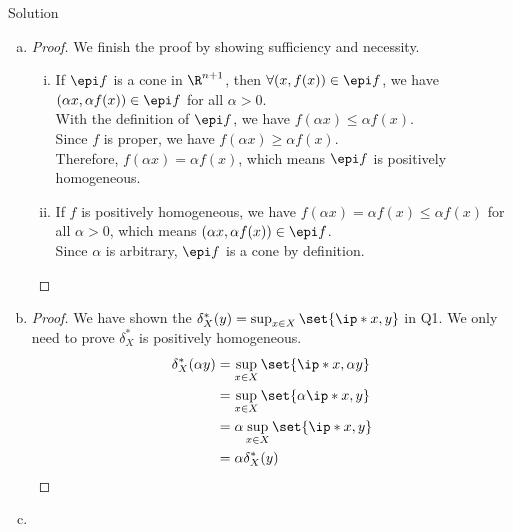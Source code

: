 \documentclass{article}
\theoremstyle{plain}
\theoremstyle{definition}
\theoremstyle{remark}
\begin{document}
\begin{solution}
    {Solution}
    \begin{enumerate}[(a)]
        \item {
            \begin{proof}
                We finish the proof by showing sufficiency and necessity.
                \begin{enumerate}[(i)]
                    \item {
                        If $\epi f$ is a cone in $\R^{n+1}$, then $\forall (x, f(x))\in\epi f$, we have $(\alpha x, \alpha f(x))\in\epi f$ for all $\alpha>0$. \\
                        With the definition of $\epi f$, we have $f(\alpha x)\leq \alpha f(x)$. \\
                        Since $f$ is proper, we have $f(\alpha x)\geq \alpha f(x)$. \\
                        Therefore, $f(\alpha x) = \alpha f(x)$, which means $\epi f$ is positively homogeneous.
                    }
                    \item {
                        If $f$ is positively homogeneous, we have $f(\alpha x) = \alpha f(x) \leq \alpha f(x)$ for all $\alpha>0$, which means $(\alpha x, \alpha f(x))\in\epi f$. \\
                        Since $\alpha$ is arbitrary, $\epi f$ is a cone by definition.
                    }
                \end{enumerate}
            \end{proof}
        }
        \item {
            \begin{proof}
                We have shown the $\delta_X^*(y)=\sup_{x\in X}\set{\ip*{x, y}}$ in Q1. We only need to prove $\delta_X^*$ is positively homogeneous. \\
                \begin{align*}
                    \delta_X^*(\alpha y) 
                    &= \sup_{x\in X}\set{\ip*{x, \alpha y}} \\
                    &= \sup_{x\in X}\set{\alpha\ip*{x, y}} \\
                    &= \alpha\sup_{x\in X}\set{\ip*{x, y}} \\
                    &= \alpha\delta_X^*(y)
                \end{align*}
            \end{proof}
        }
        \item {
}
\end{enumerate}
\end{solution}
\end{document}
